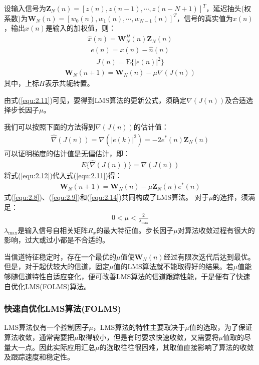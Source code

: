 设输入信号为$\mathbf{Z}_N(n)=[z(n),z(n-1),\cdots,z(n-N+1)]^T$，延迟抽头(权系数)为$\mathbf{W}_N(n)=[w_0(n),w_1(n),\cdots,w_{N-1}(n)]^T$，信号的真实值为$x(n)$，输出$\hat{x}(n)$是输入的加权值，则：
\begin{eqnarray}
    \hat{x}(n)=\mathbf{W}_N^H(n)\mathbf{Z}_N(n)
    \label{equ:2.8}
\end{eqnarray}
\begin{eqnarray}
    e(n)=x(n)-\hat{n}(n)
    \label{equ:2.9}
\end{eqnarray}
\begin{eqnarray}
    J(n)=\mathrm{E}\{|e(n)|^2\}
    \label{equ:2.10}
\end{eqnarray}
\begin{eqnarray}
    \mathbf{W}_N(n+1)=\mathbf{W}_N(n)-\mu\nabla(J(n))
    \label{equ:2.11}
\end{eqnarray}
其中，上标$H$表示共轭转置。

由式(\ref{equ:2.11})可见，要得到LMS算法的更新公式，须确定$\nabla(J(n))$及合适选择步长因子$\mu$。

我们可以按照下面的方法得到$\nabla(J(n))$的估计值：
\begin{eqnarray}
    \widehat{\nabla}(J(n))=\nabla(|e(k)|^2)=-2e^*(n)\mathbf{Z}_N(n)
    \label{equ:2.12}
\end{eqnarray}
可以证明梯度的估计值是无偏估计，即：
\begin{eqnarray}
    E\{\widehat{\nabla}(J(n))\}=\nabla(J(n))
    \label{equ:2.13}
\end{eqnarray}
将式(\ref{equ:2.12})代入式(\ref{equ:2.11})得：
\begin{eqnarray}
    \mathbf{W}_N(n+1)=\mathbf{W}_N(n)-\mu\mathbf{Z}_N(n)e^*(n)
    \label{equ:2.14}
\end{eqnarray}
式(\ref{equ:2.8})、(\ref{equ:2.9})和(\ref{equ:2.14})共同构成了LMS算法。
对于$\mu$的选择，须满足：
\begin{eqnarray}
    0<\mu<\frac{2}{\lambda_{\mathrm{max}}}
    \label{equ:2.15}
\end{eqnarray}
$\lambda_{\mathrm{max}}$是输入信号自相关矩阵$R_x$的最大特征值。步长因子$\mu$对算法收敛过程有很大的影响，过大或过小都是不合适的。

当信道特征稳定时，存在一个最优的$\mu$值使$\mathbf{W}_N(n)$经过有限次迭代后达到最优。但是，对于起伏较大的信道，固定$\mu$值的LMS算法就不能取得好的结果。若$\mu$值能够随信道特性自适应变化，便可改善LMS算法的信道跟踪性能，于是便有了快速自优化LMS(FOLMS)算法。
\subsubsection*{快速自优化LMS算法(FOLMS)}
LMS算法仅有一个控制因子$\mu$，LMS算法的特性主要取决于$\mu$值的选取，为了保证算法收敛，通常需要把$\mu$取得较小，但是有时要求快速收敛，又需要将$\mu$值取的尽量大一点。因此实际应用汇总$\mu$的选取往往很困难，其取值直接影响了算法的收敛及跟踪速度和稳定性。

